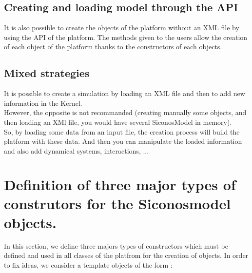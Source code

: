 \subsection{Creating and loading model through the API}
It is also  possible to create the objects of the platform without an XML file by using the API of the platform. The methods given to the users allow the creation of each object of the platform thanks to the constructors of each objects.

\subsection{Mixed strategies}
\label{mixed strategies}
It is possible to create a simulation by loading an XML file and then to add new information in the Kernel.\\
However, the opposite is not recommanded (creating manually some objects, and then loading an XMl file, you would have several SiconosModel in memory).\\
So, by loading some data from an input file, the creation process will build the platform with these data. And then you can manipulate the loaded information and also add dynamical systems, interactions, ...

\section{Definition of three major types of construtors for the Siconosmodel objects.}


In this section, we define three majors types of constructors which must be defined and used in all classes of the platfrom for the creation of objects. In order to fix ideas, we consider a template objects of the form :

  


